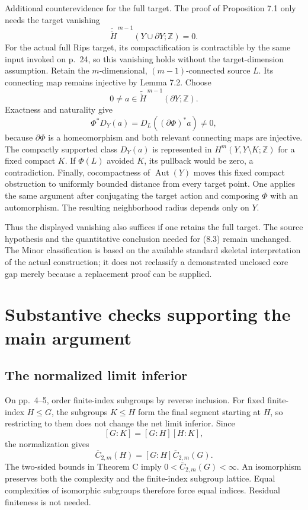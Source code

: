 \documentclass[10pt]{article}
\begin{document}
Additional counterevidence for the full target. The proof of Proposition 7.1 only needs the target vanishing \[\widetilde{\check H}^{\,m-1}(Y\cup\partial Y;\mathbb Z)=0.\] For the actual full Rips target, its compactification is contractible by the same input invoked on p. 24, so this vanishing holds without the target-dimension assumption. Retain the \(m\)-dimensional, \((m-1)\)-connected source \(L\). Its connecting map remains injective by Lemma 7.2. Choose \[0\ne a\in\widetilde{\check H}^{\,m-1}(\partial Y;\mathbb Z).\] Exactness and naturality give \[\Phi^*D_Y(a)=D_L((\partial\Phi)^*a)\ne0,\] because \(\partial\Phi\) is a homeomorphism and both relevant connecting maps are injective. The compactly supported class \(D_Y(a)\) is represented in \(H^m(Y,Y\setminus K;\mathbb Z)\) for a fixed compact \(K\). If \(\Phi(L)\) avoided \(K\), its pullback would be zero, a contradiction. Finally, cocompactness of \(\operatorname{Aut}(Y)\) moves this fixed compact obstruction to uniformly bounded distance from every target point. One applies the same argument after conjugating the target action and composing \(\Phi\) with an automorphism. The resulting neighborhood radius depends only on \(Y\).\par
Thus the displayed vanishing also suffices if one retains the full target. The source hypothesis and the quantitative conclusion needed for (8.3) remain unchanged. The Minor classification is based on the available standard skeletal interpretation of the actual construction; it does not reclassify a demonstrated unclosed core gap merely because a replacement proof can be supplied.\par
\section*{Substantive checks supporting the main argument}
\subsection*{The normalized limit inferior}
On pp. 4–5, order finite-index subgroups by reverse inclusion. For fixed finite-index \(H\le G\), the subgroups \(K\le H\) form the final segment starting at \(H\), so restricting to them does not change the net limit inferior. Since \[[G:K]=[G:H][H:K],\] the normalization gives \[\overline C_{2,m}(H)=[G:H]\overline C_{2,m}(G).\] The two-sided bounds in Theorem C imply \(0<\overline C_{2,m}(G)<\infty\). An isomorphism preserves both the complexity and the finite-index subgroup lattice. Equal complexities of isomorphic subgroups therefore force equal indices. Residual finiteness is not needed.\par
\end{document}
